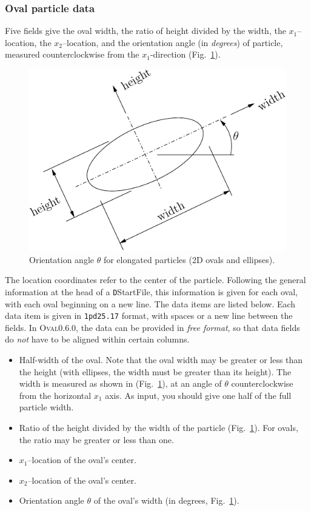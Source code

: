 \documentclass[letterpaper,11pt]{article}
\newcommand{\Oval}{\textsc{Oval}}
\begin{document}
\subsubsection{Oval particle data}\label{sec:oval_data}
Five fields give the oval width, the ratio of height divided
by the width,
the $x_{1}$--location, the $x_{2}$--location, and the orientation
angle (in \emph{degrees}) of particle, measured counterclockwise
from the $x_{1}$-direction (Fig.~\ref{fig:orientation_angle}).
%
\begin{figure}
  \centering
  \includegraphics{Figures/orientation.pdf}
  \caption{Orientation angle $\theta$ for elongated particles (2D ovals
           and ellipses).}
  \label{fig:orientation_angle}
\end{figure}
%
The location coordinates refer to the center of the particle.
Following the general information at the head of a
\texttt{D}\textsf{StartFile}, this
information is given for each oval,
with each oval beginning on a new line.
The data items are listed below.
Each data item is given in \texttt{1pd25.17} format, with
spaces or a new line between the fields.
In \Oval0.6.0, the data can be provided in \emph{free format},
so that data fields do \emph{not} have to be aligned
within certain columns.
\begin{itemize}
\item
Half-width of the oval.  
Note that the oval width may be greater or less than the height
(with ellipses, the width must be greater than its height).  
The width is measured as shown in 
(Fig.~\ref{fig:orientation_angle}), at an angle of $\theta$ counterclockwise
from the horizontal $x_{1}$ axis.
As input, you should give one half of the full particle width.
\item
Ratio of the height divided by the width of the particle
(Fig.~\ref{fig:orientation_angle}).  
For ovals, the ratio may be greater or less than one.
\item
$x_{1}$--location of the oval's center.
\item
$x_{2}$--location of the oval's center.
\item
Orientation angle $\theta$
of the oval's width (in degrees, Fig.~\ref{fig:orientation_angle}).
\end{itemize}
%
\end{document}
